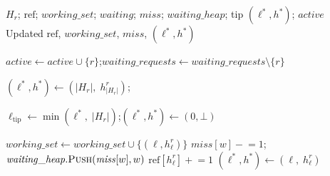 \begin{algorithm}[H]
\caption{$\textsc{AddToBatch}(r)$}
\label{alg:add_to_batch}
\begin{algorithmic}[1]
\Require $H_r$; $\mathrm{ref}$; $\mathit{working\_set}$; $\mathit{waiting}$; $\mathit{miss}$; $\mathit{waiting\_heap}$; tip $(\ell^*, h^*)$; $\mathit{active}$
\Ensure Updated $\mathrm{ref}$, $\mathit{working\_set}$, $\mathit{miss}$, $(\ell^*, h^*)$

\State $\mathit{active} \gets \mathit{active} \cup \{r\}$;\quad $\mathit{waiting\_requests} \gets \mathit{waiting\_requests} \setminus \{r\}$

  \State $(\ell^*, h^*) \gets (|H_r|,\; h_{|H_r|}^r)$;\quad \Return
\EndIf

\State $\ell_{\mathrm{tip}} \gets \min(\ell^*,\; |H_r|)$;\quad $(\ell^*, h^*) \gets (0, \bot)$

    \State $\mathit{working\_set} \gets \mathit{working\_set} \cup \{(\ell, h_\ell^r)\}$
      \State $\mathit{miss}[w] \mathrel{-}= 1$;\quad $\mathit{waiting\_heap}.\textsc{Push}(\mathit{miss}[w], w)$
    \EndFor
  \EndIf
  \State $\mathrm{ref}[h_\ell^r] \mathrel{+}= 1$
    \State $(\ell^*, h^*) \gets (\ell,\; h_\ell^r)$
  \EndIf
\EndFor
\end{algorithmic}
\end{algorithm}

